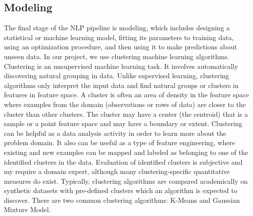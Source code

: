 \documentclass[a4paper,12pt]{report}
\begin{document}
    \subsection{Modeling}
    The final stage of the NLP pipeline is modeling, which includes designing a statistical or machine learning model, 
    fitting its parameters to training data, using an optimization procedure, and then using it to make predictions about unseen data.
    In our project, we use clustering machine learning algorithms.
    \newline\newline
    Clustering is an unsupervised machine learning task. It involves automatically discovering natural grouping in data. Unlike supervised learning, clustering algorithms only interpret the input data and find natural groups or clusters in features in feature space.
    A cluster is often an area of density in the feature space where examples from the domain (observations or rows of data) are closer to the cluster than other clusters. The cluster may have a center (the centroid) that is a sample or a point feature space and may have a boundary or extent.
    Clustering can be helpful as a data analysis activity in order to learn more about the problem domain. It also can be useful as a type of feature engineering, where existing and new examples can be mapped and labeled as belonging to one of the identified clusters in the data.
    \newline\newline
    Evaluation of identified clusters is subjective and my require a domain expert, although many clustering-specific quantitative measures do exist. Typically, clustering algorithms are compared academically on synthetic datasets with pre-defined clusters which an algorithm is expected to discover.
    There are two common clustering algorithms: K-Means and Gaussian Mixture Model.
    
\end{document}

